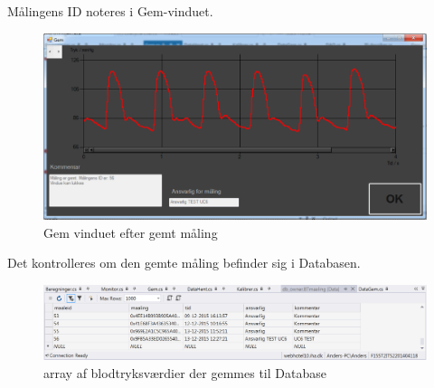 Målingens ID noteres i Gem-vinduet.

\begin{figure}[H]
	\centering
	\includegraphics[width=1\textwidth]{Figurer/UC6_MalSuc}
	\caption{Gem vinduet efter gemt måling}
\end{figure}


Det kontrolleres om den gemte måling befinder sig i Databasen. 

\begin{figure}[H]
	\centering
	\includegraphics[width=1\textwidth]{Figurer/UC6_Database2}
	\caption{array af blodtryksværdier der gemmes til Database}
\end{figure}





